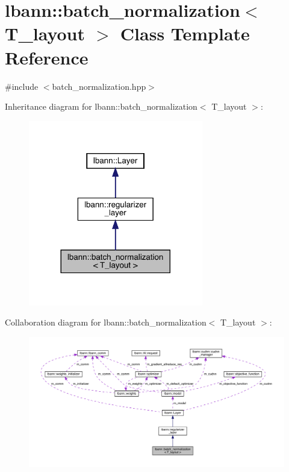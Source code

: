 \hypertarget{classlbann_1_1batch__normalization}{}\section{lbann\+:\+:batch\+\_\+normalization$<$ T\+\_\+layout $>$ Class Template Reference}
\label{classlbann_1_1batch__normalization}


{\ttfamily \#include $<$batch\+\_\+normalization.\+hpp$>$}



Inheritance diagram for lbann\+:\+:batch\+\_\+normalization$<$ T\+\_\+layout $>$\+:\nopagebreak
\begin{figure}[H]
\begin{center}
\leavevmode
\includegraphics[width=216pt]{classlbann_1_1batch__normalization__inherit__graph}
\end{center}
\end{figure}


Collaboration diagram for lbann\+:\+:batch\+\_\+normalization$<$ T\+\_\+layout $>$\+:\nopagebreak
\begin{figure}[H]
\begin{center}
\leavevmode
\includegraphics[width=350pt]{classlbann_1_1batch__normalization__coll__graph}
\end{center}
\end{figure}
